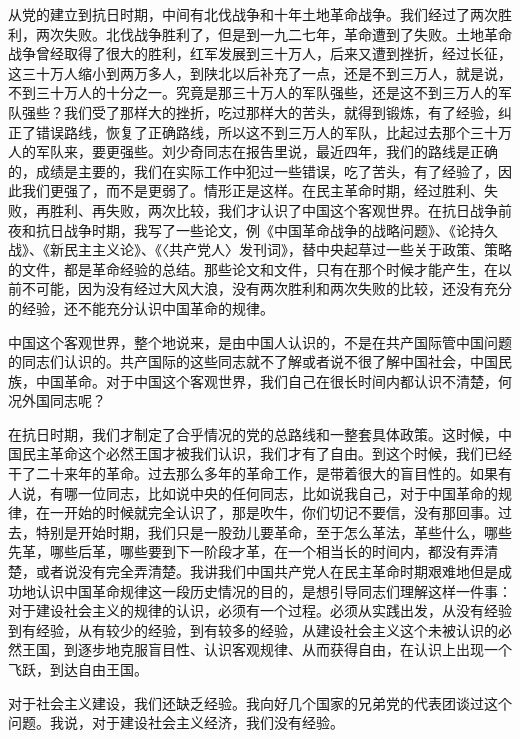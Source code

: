 从党的建立到抗日时期，中间有北伐战争和十年土地革命战争。我们经过了两次胜利，两次失败。北伐战争胜利了，但是到一九二七年，革命遭到了失败。土地革命战争曾经取得了很大的胜利，红军发展到三十万人，后来又遭到挫折，经过长征，这三十万人缩小到两万多人，到陕北以后补充了一点，还是不到三万人，就是说，不到三十万人的十分之一。究竟是那三十万人的军队强些，还是这不到三万人的军队强些？我们受了那样大的挫折，吃过那样大的苦头，就得到锻炼，有了经验，纠正了错误路线，恢复了正确路线，所以这不到三万人的军队，比起过去那个三十万人的军队来，要更强些。刘少奇同志在报告里说，最近四年，我们的路线是正确的，成绩是主要的，我们在实际工作中犯过一些错误，吃了苦头，有了经验了，因此我们更强了，而不是更弱了。情形正是这样。在民主革命时期，经过胜利、失败，再胜利、再失败，两次比较，我们才认识了中国这个客观世界。在抗日战争前夜和抗日战争时期，我写了一些论文，例《中国革命战争的战略问题》、《论持久战》、《新民主主义论》、《〈共产党人〉发刊词》，替中央起草过一些关于政策、策略的文件，都是革命经验的总结。那些论文和文件，只有在那个时候才能产生，在以前不可能，因为没有经过大风大浪，没有两次胜利和两次失败的比较，还没有充分的经验，还不能充分认识中国革命的规律。

中国这个客观世界，整个地说来，是由中国人认识的，不是在共产国际管中国问题的同志们认识的。共产国际的这些同志就不了解或者说不很了解中国社会，中国民族，中国革命。对于中国这个客观世界，我们自己在很长时间内都认识不清楚，何况外国同志呢？

在抗日时期，我们才制定了合乎情况的党的总路线和一整套具体政策。这时候，中国民主革命这个必然王国才被我们认识，我们才有了自由。到这个时候，我们已经干了二十来年的革命。过去那么多年的革命工作，是带着很大的盲目性的。如果有人说，有哪一位同志，比如说中央的任何同志，比如说我自己，对于中国革命的规律，在一开始的时候就完全认识了，那是吹牛，你们切记不要信，没有那回事。过去，特别是开始时期，我们只是一股劲儿要革命，至于怎么革法，革些什么，哪些先革，哪些后革，哪些要到下一阶段才革，在一个相当长的时间内，都没有弄清楚，或者说没有完全弄清楚。我讲我们中国共产党人在民主革命时期艰难地但是成功地认识中国革命规律这一段历史情况的目的，是想引导同志们理解这样一件事：对于建设社会主义的规律的认识，必须有一个过程。必须从实践出发，从没有经验到有经验，从有较少的经验，到有较多的经验，从建设社会主义这个未被认识的必然王国，到逐步地克服盲目性、认识客观规律、从而获得自由，在认识上出现一个飞跃，到达自由王国。

对于社会主义建设，我们还缺乏经验。我向好几个国家的兄弟党的代表团谈过这个问题。我说，对于建设社会主义经济，我们没有经验。

